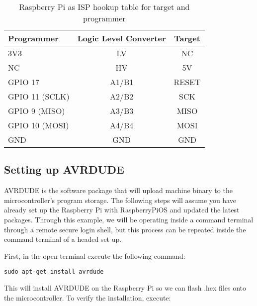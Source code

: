     \begin{table}[h!]
        \caption[RaspberryPi as ISP Hookup Guide]{Raspberry Pi as ISP hookup table for target and programmer}
        \begin{tabular}{ l | c | c }
            \toprule
            Programmer & Logic Level Converter & Target \\
    
            \midrule
            3V3                                 & LV    & NC\footnotemark   \\
            NC\footnotemark[\value{footnote}]   & HV    & 5V                \\
            GPIO 17                             & A1/B1 & RESET             \\
            GPIO 11 (SCLK)                      & A2/B2 & SCK               \\
            GPIO 9 (MISO)                       & A3/B3 & MISO              \\
            GPIO 10 (MOSI)                      & A4/B4 & MOSI              \\
            GND                                 & GND   & GND               \\
    
            \bottomrule
        \end{tabular}
    \end{table}

    \subsection*{Setting up AVRDUDE}
    AVRDUDE is the software package that will upload machine binary to the microcontroller's program storage. 
    The following steps will assume you have already set up the Raspberry Pi with RaspberryPiOS and updated the latest packages. 
    Through this example, we will be operating inside a command terminal through a remote secure login shell, but this process can be repeated inside the command terminal of a headed set up.

    First, in the open terminal execute the following command:

    \begin{lstlisting}[style=kaolstplain,linewidth=1.5\textwidth]
    sudo apt-get install avrdude
    \end{lstlisting}

    This will install AVRDUDE on the Raspberry Pi so we can flash .hex files onto the microcontroller. To verify the installation, execute:

